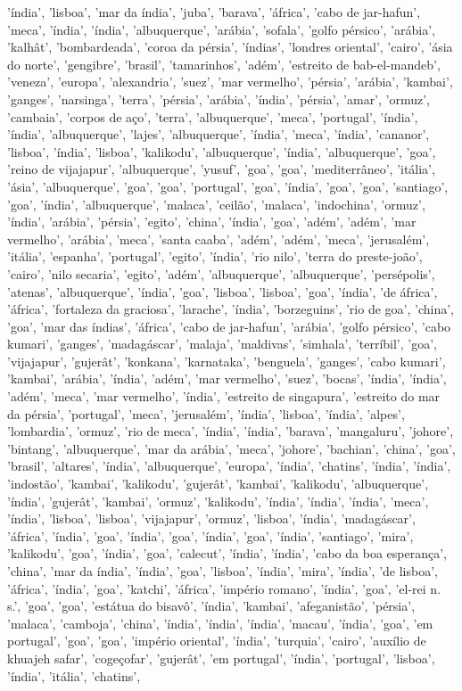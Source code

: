\documentclass{article}
\begin{document}
\begin{itemize}
'índia', 'lisboa', 'mar da índia', 'juba', 'barava', 'áfrica', 'cabo de jar-hafun', 'meca', 'índia', 'índia', 'albuquerque', 'arábia', 'sofala', 'golfo pérsico', 'arábia', 'kalhât', 'bombardeada', 'coroa da pérsia', 'índias', 'londres oriental', 'cairo', 'ásia do norte', 'gengibre', 'brasil', 'tamarinhos', 'adém', 'estreito de bab-el-mandeb', 'veneza', 'europa', 'alexandria', 'suez', 'mar vermelho', 'pérsia', 'arábia', 'kambai', 'ganges', 'narsinga', 'terra', 'pérsia', 'arábia', 'índia', 'pérsia', 'amar', 'ormuz', 'cambaia', 'corpos de aço', 'terra', 'albuquerque', 'meca', 'portugal', 'índia', 'índia', 'albuquerque', 'lajes', 'albuquerque', 'índia', 'meca', 'índia', 'cananor', 'lisboa', 'índia', 'lisboa', 'kalikodu', 'albuquerque', 'índia', 'albuquerque', 'goa', 'reino de vijajapur', 'albuquerque', 'yusuf', 'goa', 'goa', 'mediterrâneo', 'itália', 'ásia', 'albuquerque', 'goa', 'goa', 'portugal', 'goa', 'índia', 'goa', 'goa', 'santiago', 'goa', 'índia', 'albuquerque', 'malaca', 'ceilão', 'malaca', 'indochina', 'ormuz', 'índia', 'arábia', 'pérsia', 'egito', 'china', 'índia', 'goa', 'adém', 'adém', 'mar vermelho', 'arábia', 'meca', 'santa caaba', 'adém', 'adém', 'meca', 'jerusalém', 'itália', 'espanha', 'portugal', 'egito', 'índia', 'rio nilo', 'terra do preste-joão', 'cairo', 'nilo secaria', 'egito', 'adém', 'albuquerque', 'albuquerque', 'persépolis', 'atenas', 'albuquerque', 'índia', 'goa', 'lisboa', 'lisboa', 'goa', 'índia', 'de áfrica', 'áfrica', 'fortaleza da graciosa', 'larache', 'índia', 'borzeguins', 'rio de goa', 'china', 'goa', 'mar das índias', 'áfrica', 'cabo de jar-hafun', 'arábia', 'golfo pérsico', 'cabo kumari', 'ganges', 'madagáscar', 'malaja', 'maldivas', 'simhala', 'terríbil', 'goa', 'vijajapur', 'gujerât', 'konkana', 'karnataka', 'benguela', 'ganges', 'cabo kumari', 'kambai', 'arábia', 'índia', 'adém', 'mar vermelho', 'suez', 'bocas', 'índia', 'índia', 'adém', 'meca', 'mar vermelho', 'índia', 'estreito de singapura', 'estreito do mar da pérsia', 'portugal', 'meca', 'jerusalém', 'índia', 'lisboa', 'índia', 'alpes', 'lombardia', 'ormuz', 'rio de meca', 'índia', 'índia', 'barava', 'mangaluru', 'johore', 'bintang', 'albuquerque', 'mar da arábia', 'meca', 'johore', 'bachian', 'china', 'goa', 'brasil', 'altares', 'índia', 'albuquerque', 'europa', 'índia', 'chatins', 'índia', 'índia', 'indostão', 'kambai', 'kalikodu', 'gujerât', 'kambai', 'kalikodu', 'albuquerque', 'índia', 'gujerât', 'kambai', 'ormuz', 'kalikodu', 'índia', 'índia', 'índia', 'meca', 'índia', 'lisboa', 'lisboa', 'vijajapur', 'ormuz', 'lisboa', 'índia', 'madagáscar', 'áfrica', 'índia', 'goa', 'índia', 'goa', 'índia', 'goa', 'índia', 'santiago', 'mira', 'kalikodu', 'goa', 'índia', 'goa', 'calecut', 'índia', 'índia', 'cabo da boa esperança', 'china', 'mar da índia', 'índia', 'goa', 'lisboa', 'índia', 'mira', 'índia', 'de lisboa', 'áfrica', 'índia', 'goa', 'katchi', 'áfrica', 'império romano', 'índia', 'goa', 'el-rei n. s.', 'goa', 'goa', 'estátua do bisavô', 'índia', 'kambai', 'afeganistão', 'pérsia', 'malaca', 'camboja', 'china', 'índia', 'índia', 'índia', 'macau', 'índia', 'goa', 'em portugal', 'goa', 'goa', 'império oriental', 'índia', 'turquia', 'cairo', 'auxílio de khuajeh safar', 'cogeçofar', 'gujerât', 'em portugal', 'índia', 'portugal', 'lisboa', 'índia', 'itália', 'chatins', 
\end{itemize}
\end{document}
